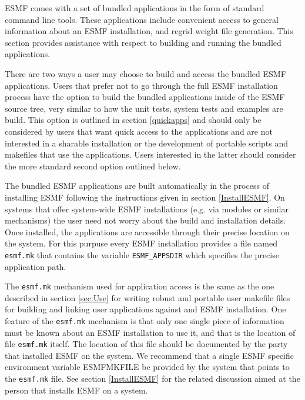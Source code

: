 
ESMF comes with a set of bundled applications in the form of standard command line tools. These applications include convenient access to general information about an ESMF installation, and regrid weight file generation. This section provides assistance with respect to building and running the bundled applications.

There are two ways a user may choose to build and access the bundled ESMF applications. Users that prefer not to go through the full ESMF installation process have the option to build the bundled applications inside of the ESMF source tree, very similar to how the unit tests, system tests and examples are build. This option is outlined in section \ref{quickapps} and should only be considered by users that want quick access to the applications and are not interested in a sharable installation or the development of portable scripts and makefiles that use the applications. Users interested in the latter should consider the more standard second option outlined below.

The bundled ESMF applications are built automatically in the process of installing ESMF following the instructions given in section \ref{InstallESMF}. On systems that offer system-wide ESMF installations (e.g. via modules or similar mechanisms) the user need not worry about the build and installation details. Once installed, the applications are accessible through their precise location on the system. For this purpuse every ESMF installation provides a file named {\tt esmf.mk} that contains the variable {\tt ESMF\_APPSDIR} which specifies the precise application path.

The {\tt esmf.mk} mechanism used for application access is the same as the one described in section \ref{sec:Use} for writing robust and portable user makefile files for building and linking user applications against and ESMF installation. One feature of the {\tt esmf.mk} mechanism is that only one single piece of information must be known about an ESMF installation to use it, and that is the location of file {\tt esmf.mk} itself. The location of this file should be documented by the party that installed ESMF on the system. We recommend that a single ESMF specific environment variable ESMFMKFILE be provided by the system that points to the {\tt esmf.mk} file. See section \ref{InstallESMF} for the related discussion aimed at the person that installs ESMF on a system.

